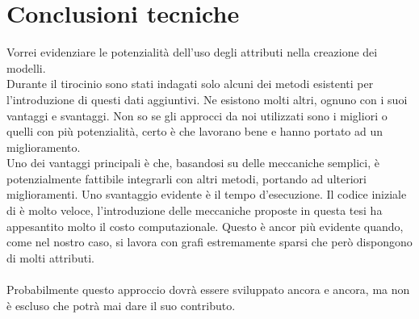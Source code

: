 \section*{Conclusioni tecniche}
Vorrei evidenziare le potenzialità dell'uso degli attributi nella creazione dei modelli.\\
Durante il tirocinio sono stati indagati solo alcuni dei metodi esistenti per l'introduzione di questi dati aggiuntivi. Ne esistono molti altri, ognuno con i suoi vantaggi e svantaggi. Non so se gli approcci da noi utilizzati sono i migliori o quelli con più potenzialità, certo è che lavorano bene e hanno portato ad un miglioramento.\\
Uno dei vantaggi principali è che, basandosi su delle meccaniche semplici, è potenzialmente fattibile integrarli con altri metodi, portando ad ulteriori miglioramenti. Uno svantaggio evidente è il tempo d'esecuzione. Il codice iniziale di \cnrl è molto veloce, l'introduzione delle meccaniche proposte in questa tesi ha appesantito molto il costo computazionale. Questo è ancor più evidente quando, come nel nostro caso, si lavora con grafi estremamente sparsi che però dispongono di molti attributi.\\
\\
Probabilmente questo approccio dovrà essere sviluppato ancora e ancora, ma non è escluso che potrà mai dare il suo contributo.
%

